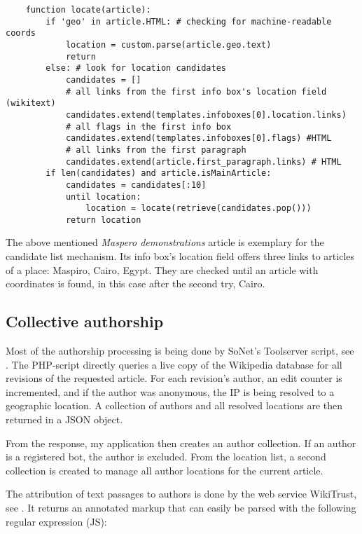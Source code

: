 \begin{lstlisting}
	function locate(article):
		if 'geo' in article.HTML: # checking for machine-readable coords
			location = custom.parse(article.geo.text)
			return
		else: # look for location candidates
			candidates = []
			# all links from the first info box's location field (wikitext)
			candidates.extend(templates.infoboxes[0].location.links)
			# all flags in the first info box 
			candidates.extend(templates.infoboxes[0].flags) #HTML
			# all links from the first paragraph
			candidates.extend(article.first_paragraph.links) # HTML
		if len(candidates) and article.isMainArticle:
			candidates = candidates[:10]
			until location:
				location = locate(retrieve(candidates.pop()))
			return location
\end{lstlisting}

The above mentioned \emph{Maspero demonstrations} article is exemplary for the candidate list mechanism.
Its info box's location field offers three links to articles of a place: Maspiro, Cairo, Egypt.
They are checked until an article with coordinates is found, in this case after the second try, Cairo.

\subsection{Collective authorship}

Most of the authorship processing is being done by SoNet's Toolserver script, see .
The \ac{PHP}-script directly queries a live copy of the Wikipedia database for all revisions of the requested article.
For each revision's author, an edit counter is incremented, and if the author was anonymous, the \ac{IP} is being resolved to a geographic location.
A collection of authors and all resolved locations are then returned in a \ac{JSON} object. 

From the response, my application then creates an author collection.
If an author is a registered bot, the author is excluded.
From the location list, a second collection is created to manage all author locations for the current article. 

The attribution of text passages to authors is done by the web service WikiTrust, see . 
It returns an annotated markup that can easily be parsed with the following regular expression (JS):

